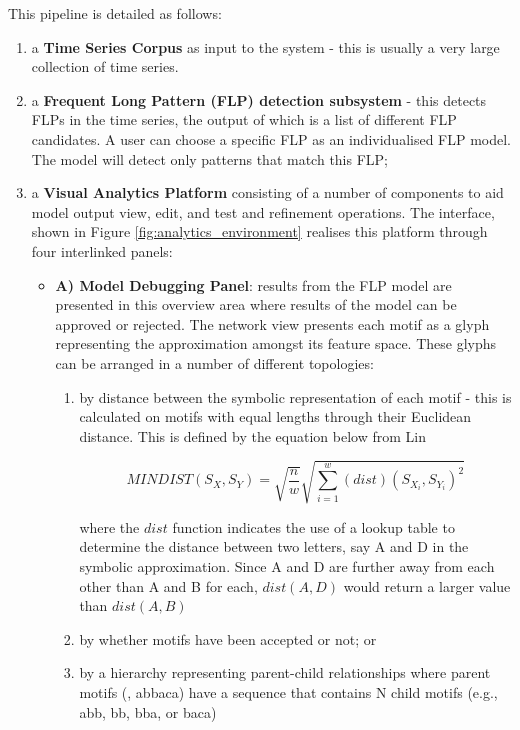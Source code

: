 This pipeline is detailed as follows:

\begin{enumerate}
\item a \textbf{Time Series Corpus} as input to the system - this is usually a very large collection of time series. 
\item a \textbf{Frequent Long Pattern (FLP) detection subsystem} - this detects FLPs in the time series, the output of which is a list of different FLP candidates.
A user can choose a specific FLP as an individualised FLP model.
The model will detect only patterns that match this FLP;
\item a \textbf{Visual Analytics Platform} consisting of a number of components to aid model output view, edit, and test and refinement operations.
The interface, shown in Figure \ref{fig:analytics_environment} realises this platform through four interlinked panels:
\begin{itemize}
\item\textbf{A) Model Debugging Panel}:  results from the FLP model are presented in this overview area where results of the model can be approved or rejected. The network view presents each motif as a glyph representing the approximation amongst its feature space. These glyphs can be arranged in a number of different topologies: 
\begin{enumerate}
\item by distance between the symbolic representation of each motif - this is calculated on motifs with equal lengths through their Euclidean distance.
This is defined by the equation below from Lin \etal \cite{linexperiencing2007}

\begin{equation}
MINDIST(S_X,S_Y) = \sqrt{\frac{n}{w}} \sqrt{\sum_{i=1}^{w} (dist)(S_{X_i}, S_{Y_i})^2}
\end{equation}

where the $dist$ function indicates the use of a lookup table to determine the distance between two letters, say A and D in the symbolic approximation. Since A and D are further away from each other than A and B for each, $dist(A,D)$ would return a larger value than $dist(A,B)$

\item by whether motifs have been accepted or not; or 
\item by a hierarchy representing parent-child relationships where parent motifs (\eg, abbaca) have a sequence that contains N child motifs (e.g., abb, bb, bba, or baca)
\end{enumerate}


\end{itemize}
\end{enumerate}
